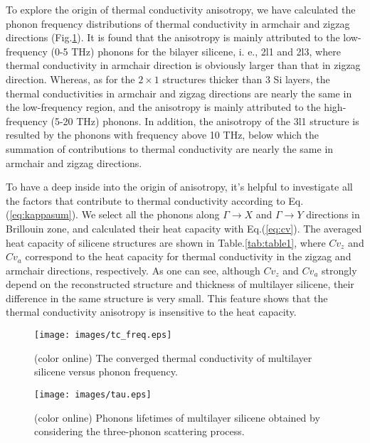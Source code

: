 \documentclass[aps,prb,twocolumn,showpacs,amsmath,amssymb]{revtex4-1}
\begin{document}
To explore the origin of thermal conductivity anisotropy, we have calculated the phonon frequency distributions of thermal conductivity in armchair and zigzag directions  (Fig.\ref{fig:tc_freq}).
It is found that the anisotropy is mainly attributed to the low-frequency (0-5 THz) phonons for the bilayer silicene, i. e., 2l1 and 2l3, where thermal conductivity in armchair direction is obviously larger than that in zigzag direction.
Whereas, as for the $2\times1$ structures thicker than 3 Si layers, the thermal conductivities in armchair and zigzag directions are nearly the same in the low-frequency region, and the anisotropy is mainly attributed to the high-frequency (5-20 THz) phonons.
In addition, the anisotropy of the 3l1 structure is resulted by the phonons with frequency above 10 THz, below which the summation of contributions to thermal conductivity are nearly the same in armchair and zigzag directions.

To have a deep inside into the origin of anisotropy, it's helpful to investigate all the factors that contribute to thermal conductivity according to Eq.(\ref{eq:kappasum}).
We select all the phonons along  $\Gamma\rightarrow X$ and $\Gamma \rightarrow Y$ directions in Brillouin zone, and calculated their heat capacity with Eq.(\ref{eq:cv}). The averaged heat capacity of silicene structures are shown in Table.\ref{tab:table1}, where $Cv_z$ and $Cv_a$ correspond to the  heat capacity for thermal conductivity in the zigzag and armchair directions, respectively.  As one can see, although $Cv_z$ and $Cv_a$  strongly depend on the reconstructed structure and thickness of multilayer silicene, their difference in the same structure is very small. This feature shows that the thermal conductivity anisotropy is insensitive to the heat capacity.


\begin{figure}[b]
  \texttt{[image: images/tc\_freq.eps]}
  \caption{\label{fig:tc_freq} (color online)  The converged thermal conductivity of multilayer silicene versus phonon frequency. }
\end{figure}

\begin{figure}[b]
  \texttt{[image: images/tau.eps]}
  \caption{\label{fig:tau} (color online)  Phonons lifetimes of multilayer silicene obtained by considering the three-phonon scattering process. }
\end{figure}
\end{document}
